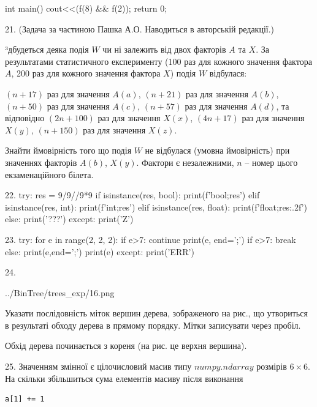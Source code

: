 \documentclass[11pt]{article}
\begin{document}
int main(){
    cout<<(f(8) && f(2));
    return 0;
}

21. 
(Задача за частиною Пашка А.О. Наводиться в авторській редакції.)\par {\hspace {0.5 cm}}³дбудеться деяка подія $W$ чи ні залежить від двох факторів $A$ та $X$. За результатами статистичного експерименту (100 раз для кожного значення фактора $A$,  200 раз для кожного значення фактора $X$) подія $W$ відбулася:\par {\hspace {0.5 cm}}$(n+17)$ раз для значення $A(a)$, $(n+21)$ раз для значення $A(b)$, $(n+50)$ раз для значення $A(c)$, $(n+57)$ раз для значення $A(d)$, та відповідно $(2n+100)$ раз для значення $X(x)$, $(4n+17)$ раз для значення $X(y)$, $(n+150)$ раз для значення $X(z)$.\par
{\hspace {0.5 cm}}Знайти ймовірність того що подія $W$ не відбулася (умовна ймовірність) при значеннях факторів $A(b)$, $X(y)$. Фактори є незалежними, $n$ – номер цього екзаменаційного білета.\par
22. 
try:
    res = 9/9//9*9
    if isinstance(res, bool):
        print(f'bool;{res}')
    elif isinstance(res, int):
        print(f'int;{res}')
    elif isinstance(res, float):
        print(f'float;{res:.2f}')
    else:
        print('???')
except:
    print('Z')

23. 
try:
    for e in range(2, 2, 2):
        if e>7:
            continue
        print(e, end=';')
        if e>7:
            break
    else:
        print(e,end=';')
    print(e)
except:
    print('ERR')

24. 

\begin{center}
	{../BinTree/trees_exp/16.png}
\end{center}
Указати послідовність міток вершин дерева, зображеного на рис., що утвориться в результаті обходу дерева в прямому порядку. Мітки записувати через пробіл.\par Обхід дерева починається з кореня (на рис. це верхня вершина).

25. 
Значенням змінної  є цілочисловий масив типу $numpy.ndarray$ розмірів $6{\times}6$. На скільки збільшиться сума елементів масиву  після виконання
\begin{verbatim}
a[1] += 1
\end{verbatim}
\end{document}
